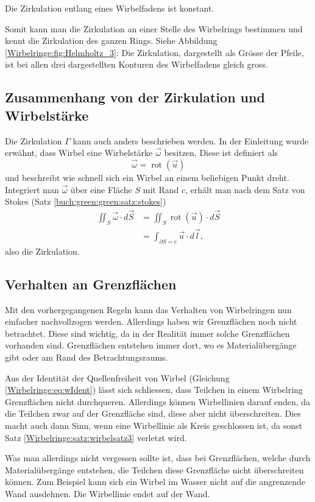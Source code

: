 \begin{satz}
    \label{Wirbelringe:satz:wirbelsatz3}
    Die Zirkulation entlang eines Wirbelfadens ist konstant. 
\end{satz}

Somit kann man die Zirkulation an einer Stelle des Wirbelrings bestimmen und kennt die Zirkulation des ganzen Rings.
Siehe Abbildung \ref{Wirbelringe:fig:Helmholtz_3}: 
Die Zirkulation, dargestellt als Grösse der Pfeile, ist bei allen drei dargestellten Konturen des Wirbelfadens gleich gross.

\subsection{Zusammenhang von der Zirkulation und Wirbelstärke\label{Wirbelringe:Stokes}}

Die Zirkulation \(\Gamma\) kann auch anders beschrieben werden. 
In der Einleitung wurde erwähnt, dass Wirbel eine Wirbelstärke \(\vec{\omega}\) besitzen.
Diese ist definiert als
\[
\vec{\omega}
=
\operatorname{rot}(\vec{u})
\]
und beschreibt wie schnell sich ein Wirbel an einem beliebigen Punkt dreht.
Integriert man \(\vec{\omega}\) über eine Fläche \(S\) mit Rand \(c\), erhält man nach dem Satz von Stokes (Satz \ref{buch:green:green:satz:stokes})
\begin{align*}
\iint_{S} \vec{\omega} \cdot d \vec{S}
&=
\iint_{S} \operatorname{rot}(\vec{u})\cdot  d \vec{S}\\
&=
\int_{\partial S = c} \vec{u} \cdot d\vec{l},
\end{align*}
also die Zirkulation.

\subsection{Verhalten an Grenzflächen\label{Wirbelringe:Grenzflaechen}}

Mit den vorhergegangenen Regeln kann das Verhalten von Wirbelringen nun einfacher nachvollzogen werden.
Allerdings haben wir Grenzflächen noch nicht betrachtet.
Diese sind wichtig, da in der Realität immer solche Grenzflächen vorhanden sind.
Grenzflächen entstehen immer dort, wo es Materialübergänge gibt oder am Rand des Betrachtungsraums.

Aus der Identität der Quellenfreiheit von Wirbel (Gleichung \eqref{Wirbelringe:eq:wIdent}) lässt sich schliessen, dass Teilchen in einem Wirbelring Grenzflächen nicht durchqueren.
Allerdings können Wirbellinien darauf enden, da die Teilchen zwar auf der Grenzfläche sind, diese aber nicht überschreiten.
Dies macht auch dann Sinn, wenn eine Wirbellinie als Kreis geschlossen ist, da sonst Satz \ref{Wirbelringe:satz:wirbelsatz3} verletzt wird.

Was man allerdings nicht vergessen sollte ist, dass bei Grenzflächen, welche durch Materialübergänge entstehen, die Teilchen diese Grenzfläche nicht überschreiten können.
Zum Beispiel kann sich ein Wirbel im Wasser nicht auf die angrenzende Wand ausdehnen.
Die Wirbellinie endet auf der Wand.
